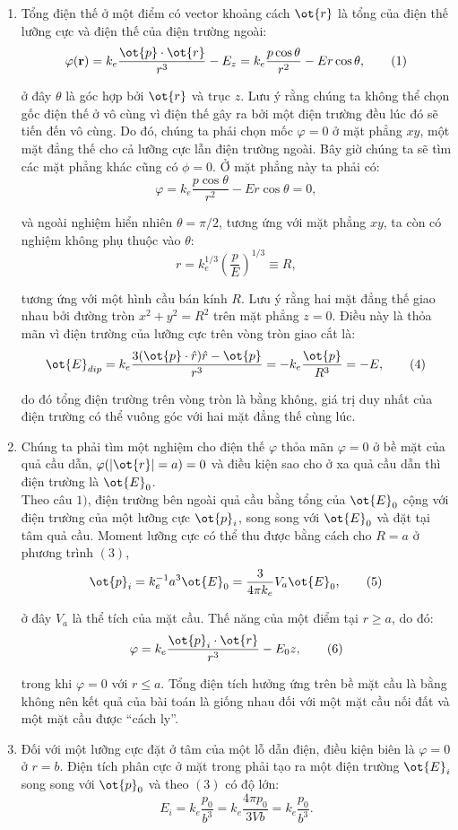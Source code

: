 \begin{loigiai} 
\begin{enumerate}[1)]
  \item Tổng điện thế ở một điểm có vector khoảng cách $\ot{r}$ là tổng của điện thế lưỡng cực và điện thế của điện trường ngoài:
     \[\varphi (\mathbf{r}) = k_e \frac{\ot{p}\cdot\ot{r}}{r^3} - E_z = k_e \frac{p\cos\theta}{r^2} - Er\cos\theta, \tag{1}\]

ở đây $\theta$ là góc hợp bởi $\ot{r}$ và trục $z$. Lưu ý rằng chúng ta không thể chọn gốc điện thế ở vô cùng vì điện thế gây ra bởi một điện trường đều lúc đó sẽ tiến đến vô cùng. Do đó, chúng ta phải chọn mốc $\varphi=0$ ở mặt phẳng $xy$, một mặt đẳng thế cho cả lưỡng cực lẫn điện trường ngoài. Bây giờ chúng ta sẽ tìm các mặt phẳng khác cũng có $\phi=0$. Ở mặt phẳng này ta phải có:
    \[\varphi = k_e \frac{p\cos \theta}{r^2} - Er\cos\theta =0, \tag{2}\]

và ngoài nghiệm hiển nhiên $\theta=\pi/2$, tương ứng với mặt phẳng $xy$, ta còn có nghiệm không phụ thuộc vào $\theta$:
   \[ r= k_e^{1/ 3} \left( \frac{p}{E}\right)^{1/ 3} \equiv R, \tag{3}\]

tương ứng với một hình cầu bán kính $R$. Lưu ý rằng hai mặt đẳng thế giao nhau bởi đường tròn $x^2 + y^2= R^2$ trên mặt phẳng $z=0$. Điều này là thỏa mãn vì điện trường của lưỡng cực trên vòng tròn giao cắt là:
  \[\ot{E}_{dip} = k_e \frac{3 (\ot{p} \cdot \hat{r})\hat{r} -\ot{p}}{r^3} = -k_e \frac{\ot{p}}{R^3} = -E, \tag{4} \] 

do đó tổng điện trường trên vòng tròn là bằng không, giá trị duy nhất của điện trường có thể vuông góc với hai mặt đẳng thế cùng lúc.
  \item Chúng ta phải tìm một nghiệm cho điện thế $\varphi$ thỏa mãn $\varphi=0$ ở bề mặt của quả cầu dẫn, $\varphi(|\ot{r}|=a) =0$ và điều kiện sao cho ở xa quả cầu dẫn thì điện trường là $\ot{E}_0$.\\
Theo câu $1)$, điện trường bên ngoài quả cầu bằng tổng của $\ot{E}_0$ cộng với điện trường của một lưỡng cực $\ot{p}_i$, song song với $\ot{E}_0$ và đặt tại tâm quả cầu. Moment lưỡng cực có thể thu được bằng cách cho $R=a$ ở phương trình $(3)$,
   \[\ot{p}_i = k_e^{-1} a^3 \ot{E}_0 = \frac{3}{4\pi k_e}V_a \ot{E}_0, \tag{5}\]

ở đây $V_a$ là thể tích của mặt cầu. Thế năng của một điểm tại $r\geq a$, do đó:
   \[\varphi = k_e \frac{\ot{p}_i \cdot \ot{r}}{r^3} - E_0 z, \tag{6} \]

trong khi $\varphi=0$ với $r\leq a $. Tổng điện tích hưởng ứng trên bề mặt cầu là bằng không nên kết quả của bài toán là giống nhau đối với một mặt cầu nối đất và một mặt cầu được “cách ly”.
\item Đối với một lưỡng cực đặt ở tâm của một lỗ dẫn điện, điều kiện biên là $\varphi =0$ ở $r=b$. Điện tích phân cực ở mặt trong phải tạo ra một điện trường $\ot{E}_i$ song song với $\ot{p}_0$ và theo $(3)$ có độ lớn:
     \[E_i = k_e \frac{p_0}{b^3} = k_e \frac{4\pi p_0}{3V b} = k_e \frac{p_0}{b^3}. \tag{7}\]


\end{enumerate}
\end{loigiai}
